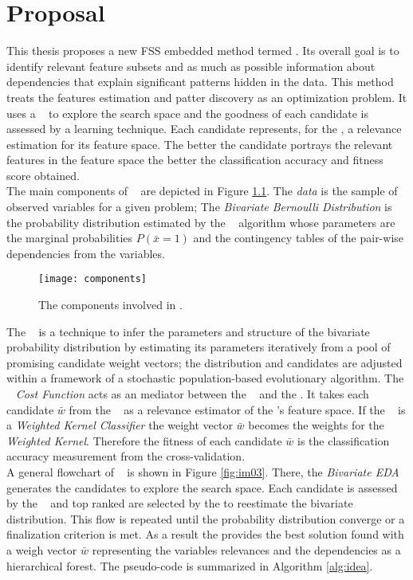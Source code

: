 \chapter{Proposal}
\label{ch:prop}

This thesis proposes a new FSS embedded method termed \WKII. Its overall goal is to identify relevant feature subsets and as much as possible information about dependencies that explain significant patterns hidden in the data. This method treats the features estimation and patter discovery as an optimization problem. It uses a \EDA~ to explore the search space and the goodness of each candidate is assessed by a learning technique.  Each candidate represents, for the \Learner, a relevance estimation for its feature space. The better the candidate portrays the relevant features in the feature space the better the classification accuracy and fitness score obtained. \\
The main components of \WKII~ are depicted in Figure \ref{fig:im02}. The \emph{data} is the sample of observed variables for a given problem;  The \emph{Bivariate Bernoulli Distribution} is the probability distribution estimated by the \EDA~ algorithm whose parameters are the marginal probabilities $P(\bar{x} = 1 )$ and the contingency tables of the pair-wise dependencies from the variables.

\begin{figure}[ht]
	\centering
		\texttt{[image: components]}
	\caption{The components involved in \WKII .}
	\label{fig:im02}
\end{figure}

The \EDA~ is a technique to infer the parameters and structure of the bivariate probability distribution by estimating its parameters iteratively from a pool of promising candidate weight vectors; the distribution and candidates are adjusted within a framework of a stochastic population-based evolutionary algorithm. The \WK~ \emph{Cost Function} acts as an mediator between the \EDA~ and the \Learner. It takes each candidate \(\bar{w}\) from the \EDA~ as a relevance estimator of the \Learner's feature space. If the \Learner~ is a \emph{Weighted Kernel Classifier} the weight vector \(\bar{w}\) becomes the weights for the \emph{Weighted Kernel}. Therefore the fitness of each candidate \(\bar{w}\) is the classification accuracy measurement from the cross-validation.\\

A general flowchart of \WKII~ is shown in Figure \ref{fig:im03}.  There, the \emph{Bivariate EDA} generates the candidates to explore the search space.  Each candidate is assessed by the \Learner~ and top ranked are selected by the \EDA to reestimate the bivariate distribution.  This flow is repeated until the probability distribution converge or a finalization criterion is met.  As a result the \EDA provides the best solution found with a weigh vector \(\bar{w}\) representing the variables relevances and the dependencies as a hierarchical forest. The pseudo-code is summarized in Algorithm \ref{alg:idea}.

